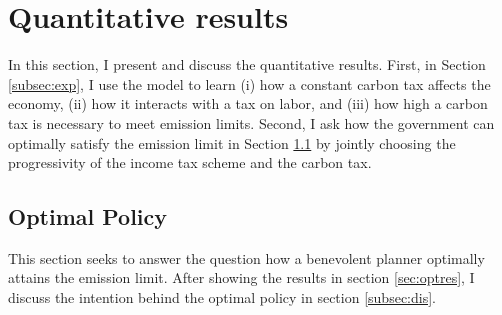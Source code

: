 \section{Quantitative results}\label{sec:res}

In this section, I present and discuss the quantitative results. 
First, in Section \ref{subsec:exp}, I use the model to learn (i) how a constant carbon tax affects the economy, (ii) how it interacts with a tax on labor, and (iii) how high a carbon tax is necessary to meet emission limits.
Second, I ask how the government can optimally satisfy the emission limit in Section \ref{subsec:mr} by jointly choosing the progressivity of the income tax scheme and the carbon tax. 




\subsection{Optimal Policy}\label{subsec:mr}


This section seeks to answer the question how a benevolent planner optimally attains the emission limit. After showing the results in section \ref{sec:optres}, I discuss the intention behind the optimal policy in section \ref{subsec:dis}. 

